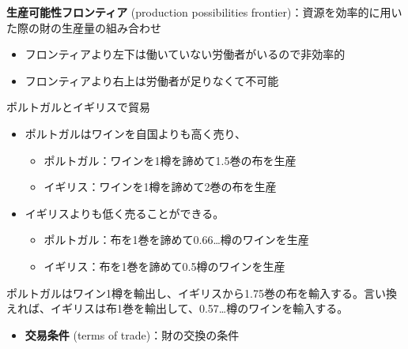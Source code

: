 \documentclass[
  xelatex,
  ja=standard]{bxjsarticle}
\providecommand{\tightlist}{%
  \setlength{\itemsep}{0pt}\setlength{\parskip}{0pt}}\usepackage{longtable,booktabs,array}
\begin{document}
\textbf{生産可能性フロンティア} (production possibilities
frontier)：資源を効率的に用いた際の財の生産量の組み合わせ

\begin{itemize}
\tightlist
\item
  フロンティアより左下は働いていない労働者がいるので非効率的
\item
  フロンティアより右上は労働者が足りなくて不可能
\end{itemize}

ポルトガルとイギリスで貿易

\begin{itemize}
\tightlist
\item
  ポルトガルはワインを自国よりも高く売り、

  \begin{itemize}
  \tightlist
  \item
    ポルトガル：ワインを1樽を諦めて1.5巻の布を生産
  \item
    イギリス：ワインを1樽を諦めて2巻の布を生産
  \end{itemize}
\item
  イギリスよりも低く売ることができる。

  \begin{itemize}
  \tightlist
  \item
    ポルトガル：布を1巻を諦めて0.66\ldots 樽のワインを生産
  \item
    イギリス：布を1巻を諦めて0.5樽のワインを生産
  \end{itemize}
\end{itemize}

\begin{tcolorbox}[enhanced jigsaw, coltitle=black, breakable, opacitybacktitle=0.6, left=2mm, titlerule=0mm, arc=.35mm, colbacktitle=quarto-callout-tip-color!10!white, opacityback=0, leftrule=.75mm, title=\textcolor{quarto-callout-tip-color}{\faLightbulb}\hspace{0.5em}{イギリスとポルトガルの貿易'\,'}, toptitle=1mm, bottomrule=.15mm, colframe=quarto-callout-tip-color-frame, toprule=.15mm, colback=white, rightrule=.15mm, bottomtitle=1mm]

ポルトガルはワイン1樽を輸出し、イギリスから1.75巻の布を輸入する。言い換えれば、イギリスは布1巻を輸出して、0.57\ldots 樽のワインを輸入する。

\end{tcolorbox}

\begin{itemize}
\tightlist
\item
  \textbf{交易条件} (terms of trade)：財の交換の条件
\end{itemize}
\end{document}
